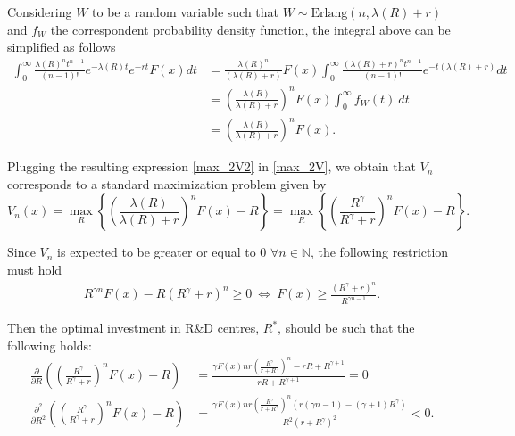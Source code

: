 Considering $W$ to be a random variable such that $W \sim \text{Erlang}(n, \lambda(R)+r)$ and $f_W$ the correspondent probability density function, the integral above can be simplified as follows
\begin{align}
\int_0 ^\infty \frac{\lambda(R)^n t^{n-1}}{(n-1)!} e^{-\lambda(R)t} e^{-rt} F(x) dt &=
\frac{\lambda(R)^n}{(\lambda(R)+r)} F(x) \int_0 ^\infty \frac{(\lambda(R)+r)^n t^{n-1}}{(n-1)!} e^{-t(\lambda(R)+r)} dt \nonumber \\
&=\left( \frac{\lambda(R)}{\lambda(R)+r}\right)^n F(x)  \int_0 ^\infty f_W(t) \ dt \nonumber \\
&=\left( \frac{\lambda(R)}{\lambda(R)+r}\right)^n F(x). \label{max_2V2}
\end{align}

Plugging the resulting expression \eqref{max_2V2} in \eqref{max_2V}, we obtain that $V_n$ corresponds to a standard maximization problem given by
\begin{equation}
V_n(x)=\max_R \left\{ \left( \frac{\lambda(R)}{\lambda(R)+r}\right)^n F(x)-R \right\}=\max_R \left\{ \left( \frac{R^\gamma}{R^\gamma+r}\right)^n F(x)-R \right\}.
	\label{max_2V3}
\end{equation}

Since $V_n$ is expected to be greater or equal to 0 $\forall n \in \mathds{N}$, the following restriction must hold
\begin{align}
R^{\gamma n} F(x)-R(R^\gamma + r)^n \geq 0 \  \Leftrightarrow \ F(x) \geq \frac{(R^\gamma+r)^n}{R^{\gamma n -1}}.
\label{max_2rest}
\end{align}


Then the optimal investment in R\&D centres, $R^*$, should be such that the following holds:
\begin{align}
\frac{\partial}{\partial R} \left( \left( \frac{R^\gamma}{R^\gamma+r}\right)^n F(x)-R \right) &= \frac{\gamma  F(x) n r \left(\frac{R^{\gamma }}{r+R^{\gamma }}\right)^n-r R+R^{\gamma +1}}{r R+R^{\gamma +1}}=0 \label{max_2ddR}\\
\frac{\partial^2}{\partial R^2} \left( \left( \frac{R^\gamma}{R^\gamma+r}\right)^n F(x)-R\right) &=
\frac{\gamma  F(x) n r \left(\frac{R^{\gamma }}{r+R^{\gamma }}\right)^n \left(r (\gamma  n-1)-(\gamma +1) R^{\gamma }\right)}{R^2 \left(r+R^{\gamma }\right)^2}<0.
\label{max_2d2dR2}
\end{align}


